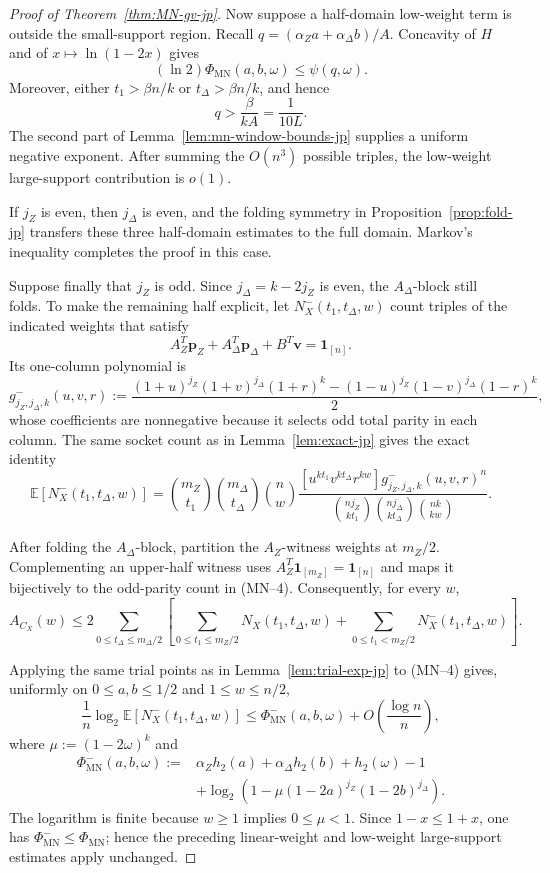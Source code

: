 \documentclass[11pt]{article}
\theoremstyle{definition}
\newcommand{\EE}{\mathbb E}
\newcommand{\bp}{\mathbf p}
\newcommand{\bv}{\mathbf v}
\newcommand{\ones}{\mathbf 1}
\newcommand{\h}{h_2}
\newcommand{\CX}{C_X}
\newcommand{\NX}{N_X}
\begin{document}
\begin{proof}[Proof of Theorem~\ref{thm:MN-gv-jp}]
Now suppose a half-domain low-weight term is outside the small-support
region.  Recall \(q=(\alpha_Za+\alpha_\Delta b)/A\).
Concavity of \(H\) and of \(x\mapsto\ln(1-2x)\) gives
\[
(\ln2)\Phi_{\mathrm{MN}}(a,b,\omega)\le\psi(q,\omega).
\]
Moreover, either \(t_1>\beta n/k\) or
\(t_\Delta>\beta n/k\), and hence
\[
q>\frac{\beta}{kA}=\frac1{10L}.
\]
The second part of Lemma~\ref{lem:mn-window-bounds-jp} supplies a uniform
negative exponent.  After summing the \(O(n^3)\) possible triples, the
low-weight large-support contribution is \(o(1)\).

If \(j_Z\) is even, then \(j_\Delta\) is even, and the folding symmetry in
Proposition~\ref{prop:fold-jp} transfers these three half-domain estimates
to the full domain.  Markov's inequality completes the proof in this case.

Suppose finally that \(j_Z\) is odd.  Since \(j_\Delta=k-2j_Z\) is even,
the \(A_\Delta\)-block still folds.  To make the remaining half explicit,
let \(N_X^-(t_1,t_\Delta,w)\) count triples of the indicated weights that
satisfy
\[
A_Z^T\bp_Z+A_\Delta^T\bp_\Delta+B^T\bv=\ones_{[n]}.
\]
Its one-column polynomial is
\[
g^-_{j_Z,j_\Delta,k}(u,v,r)
:=\frac{(1+u)^{j_Z}(1+v)^{j_\Delta}(1+r)^k
-(1-u)^{j_Z}(1-v)^{j_\Delta}(1-r)^k}{2},
\]
whose coefficients are nonnegative because it selects odd total parity in
each column.  The same socket count as in Lemma~\ref{lem:exact-jp} gives
the exact identity
\[
\EE[N_X^-(t_1,t_\Delta,w)]
=\binom{m_Z}{t_1}\binom{m_\Delta}{t_\Delta}\binom nw
\frac{[u^{kt_1}v^{kt_\Delta}r^{kw}]
      g^-_{j_Z,j_\Delta,k}(u,v,r)^n}
{\binom{nj_Z}{kt_1}\binom{nj_\Delta}{kt_\Delta}\binom{nk}{kw}}.
\tag{MN--4}
\]

After folding the \(A_\Delta\)-block, partition the \(A_Z\)-witness
weights at \(m_Z/2\).  Complementing an upper-half witness uses
\(A_Z^T\ones_{[m_Z]}=\ones_{[n]}\) and maps it bijectively to the
odd-parity count in (MN--4).  Consequently, for every \(w\),
\[
A_{\CX}(w)\le
2\sum_{0\le t_\Delta\le m_\Delta/2}
\left[
 \sum_{0\le t_1\le m_Z/2}\NX(t_1,t_\Delta,w)
 +\sum_{0\le t_1<m_Z/2}N_X^-(t_1,t_\Delta,w)
\right].                                                     \tag{MN--5}
\]

Applying the same trial points as in Lemma~\ref{lem:trial-exp-jp} to
(MN--4) gives, uniformly on \(0\le a,b\le1/2\) and \(1\le w\le n/2\),
\[
\frac1n\log_2\EE[N_X^-(t_1,t_\Delta,w)]
\le \Phi_{\mathrm{MN}}^-(a,b,\omega)
   +O\!\left(\frac{\log n}{n}\right),
\]
where \(\mu:=(1-2\omega)^k\) and
\[
\begin{aligned}
\Phi_{\mathrm{MN}}^-(a,b,\omega)
:={}&\alpha_Z\h(a)+\alpha_\Delta\h(b)+\h(\omega)-1\\
&+\log_2\!\left(1-\mu(1-2a)^{j_Z}(1-2b)^{j_\Delta}\right).
\end{aligned}                                                \tag{MN--6}
\]
The logarithm is finite because \(w\ge1\) implies \(0\le\mu<1\).
Since \(1-x\le1+x\), one has
\(\Phi_{\mathrm{MN}}^-\le\Phi_{\mathrm{MN}}\); hence the preceding
linear-weight and low-weight large-support estimates apply unchanged.


\end{proof}
\end{document}
